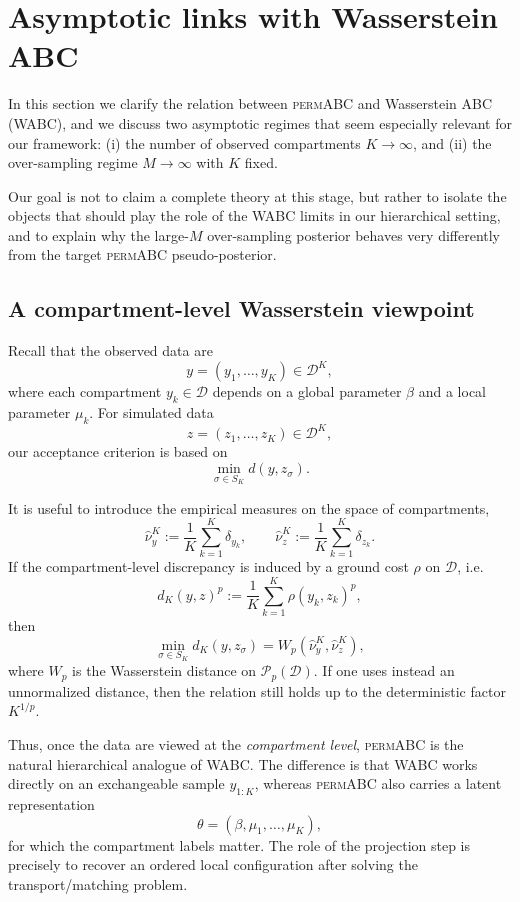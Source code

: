 \section{Asymptotic links with Wasserstein ABC}
\label{sec:asymptotics}

In this section we clarify the relation between \textsc{permABC} and Wasserstein ABC (WABC),
and we discuss two asymptotic regimes that seem especially relevant for our framework:
(i) the number of observed compartments $K \to \infty$, and (ii) the over-sampling regime
$M \to \infty$ with $K$ fixed.

Our goal is not to claim a complete theory at this stage, but rather to isolate the objects that
should play the role of the WABC limits in our hierarchical setting, and to explain why the
large-$M$ over-sampling posterior behaves very differently from the target \textsc{permABC}
pseudo-posterior.

\subsection{A compartment-level Wasserstein viewpoint}

Recall that the observed data are
\[
  y = (y_1,\dots,y_K) \in \mathcal D^K,
\]
where each compartment $y_k \in \mathcal D$ depends on a global parameter $\beta$ and a local
parameter $\mu_k$. For simulated data
\[
  z = (z_1,\dots,z_K) \in \mathcal D^K,
\]
our acceptance criterion is based on
\[
  \min_{\sigma \in S_K} d(y,z_\sigma).
\]

It is useful to introduce the empirical measures on the space of compartments,
\[
  \widehat\nu_y^K := \frac1K \sum_{k=1}^K \delta_{y_k},
  \qquad
  \widehat\nu_z^K := \frac1K \sum_{k=1}^K \delta_{z_k}.
\]
If the compartment-level discrepancy is induced by a ground cost $\rho$ on $\mathcal D$, i.e.
\[
  d_K(y,z)^p := \frac1K \sum_{k=1}^K \rho(y_k,z_k)^p,
\]
then
\[
  \min_{\sigma\in S_K} d_K(y,z_\sigma)
  = W_p(\widehat\nu_y^K,\widehat\nu_z^K),
\]
where $W_p$ is the Wasserstein distance on $\mathcal P_p(\mathcal D)$. If one uses instead an
unnormalized distance, then the relation still holds up to the deterministic factor $K^{1/p}$.

Thus, once the data are viewed at the \emph{compartment level}, \textsc{permABC} is the natural
hierarchical analogue of WABC. The difference is that WABC works directly on an exchangeable
sample $y_{1:K}$, whereas \textsc{permABC} also carries a latent representation
\[
  \theta = (\beta,\mu_1,\dots,\mu_K),
\]
for which the compartment labels matter. The role of the projection step is precisely to recover
an ordered local configuration after solving the transport/matching problem.

